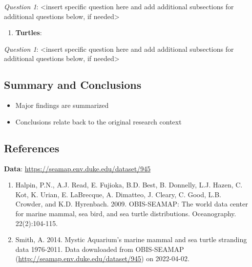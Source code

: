 \documentclass[
  12pt,
]{article}
\providecommand{\tightlist}{%
  \setlength{\itemsep}{0pt}\setlength{\parskip}{0pt}}
\begin{document}
\emph{Question 1}: \textless insert specific question here and add
additional subsections for additional questions below, if
needed\textgreater{}

\begin{enumerate}
\def\labelenumi{\arabic{enumi}.}
\setcounter{enumi}{2}
\tightlist
\item
  \textbf{Turtles}:
\end{enumerate}

\emph{Question 1}: \textless insert specific question here and add
additional subsections for additional questions below, if
needed\textgreater{}

\newpage

\hypertarget{summary-and-conclusions}{%
\subsection{Summary and Conclusions}\label{summary-and-conclusions}}

\begin{itemize}
\tightlist
\item
  Major findings are summarized
\item
  Conclusions relate back to the original research context
\end{itemize}

\newpage

\hypertarget{references}{%
\subsection{References}\label{references}}

\textbf{Data}: \url{https://seamap.env.duke.edu/dataset/945}

\begin{enumerate}
\def\labelenumi{\arabic{enumi}.}
\item
  Halpin, P.N., A.J. Read, E. Fujioka, B.D. Best, B. Donnelly, L.J.
  Hazen, C. Kot, K. Urian, E. LaBrecque, A. Dimatteo, J. Cleary, C.
  Good, L.B. Crowder, and K.D. Hyrenbach. 2009. OBIS-SEAMAP: The world
  data center for marine mammal, sea bird, and sea turtle distributions.
  Oceanography. 22(2):104-115.
\item
  Smith, A. 2014. Mystic Aquarium's marine mammal and sea turtle
  stranding data 1976-2011. Data downloaded from OBIS-SEAMAP
  (\url{http://seamap.env.duke.edu/dataset/945}) on 2022-04-02.
\end{enumerate}
\end{document}
